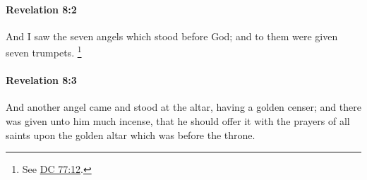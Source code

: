 		\paragraph{Revelation 8:2} %
			\label{REVELATIONNT-8-2}

			And I saw the seven angels which stood before God; and to them were given seven trumpets.%
				\footnote{%
					See \hyperref[DC77-12]{DC 77:12}.
					}

			\begin{framed}
			\scriptsize
				\begin{compactdesc}
					\item[SBLG] 
				\end{compactdesc}
			\end{framed}

		\paragraph{Revelation 8:3} %
			\label{REVELATIONNT-8-3}

			And another angel came and stood at the altar, having a golden censer; and there was given unto him much incense, that he should offer it with the prayers of all saints upon the golden altar which was before the throne.

